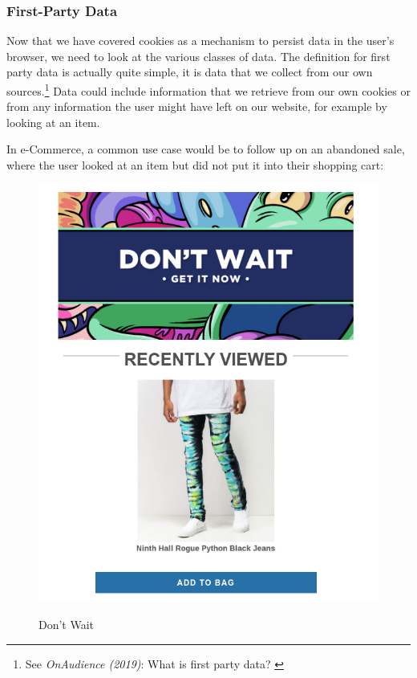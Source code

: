 \subsubsection{First-Party Data}

Now that we have covered cookies as a mechanism to persist data in the user's browser, we need to look at the various classes of data. The definition for first party data is actually quite simple, it is data that we collect from our own sources.\footnote{See \textit{OnAudience (2019)}: What is first party data? \cite{firstParty}} Data could include information that we retrieve from our own cookies or from any information the user might have left on our website, for example by looking at an item.

In e-Commerce, a common use case would be to follow up on an abandoned sale, where the user looked at an item but did not put it into their shopping cart:

\begin{figure}[H]
\centering
\caption {Don't Wait}
\includegraphics[width=\linewidth]{images/zumiez-dont-wait.png}
\label{fig:zumiez}
\end{figure}

